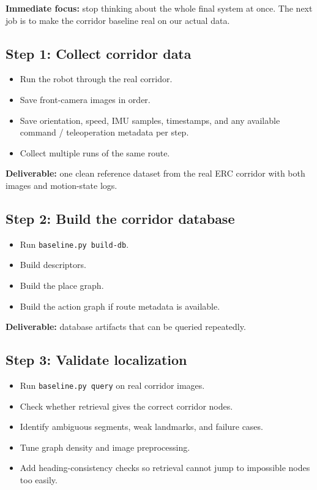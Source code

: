 \documentclass[11pt,a4paper]{article}
\begin{document}
\begin{mdframed}
\textbf{Immediate focus:} stop thinking about the whole final system at once.
The next job is to make the corridor baseline real on our actual data.
\end{mdframed}

\subsection*{Step 1: Collect corridor data}

\begin{itemize}[nosep]
  \item Run the robot through the real corridor.
  \item Save front-camera images in order.
  \item Save orientation, speed, IMU samples, timestamps, and any available command / teleoperation metadata per step.
  \item Collect multiple runs of the same route.
\end{itemize}

\textbf{Deliverable:} one clean reference dataset from the real ERC corridor with both images and motion-state logs.

\subsection*{Step 2: Build the corridor database}

\begin{itemize}[nosep]
  \item Run \texttt{baseline.py build-db}.
  \item Build descriptors.
  \item Build the place graph.
  \item Build the action graph if route metadata is available.
\end{itemize}

\textbf{Deliverable:} database artifacts that can be queried repeatedly.

\subsection*{Step 3: Validate localization}

\begin{itemize}[nosep]
  \item Run \texttt{baseline.py query} on real corridor images.
  \item Check whether retrieval gives the correct corridor nodes.
  \item Identify ambiguous segments, weak landmarks, and failure cases.
  \item Tune graph density and image preprocessing.
  \item Add heading-consistency checks so retrieval cannot jump to impossible nodes too easily.
\end{itemize}
\end{document}
